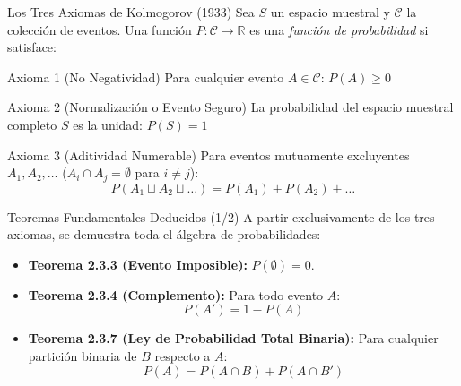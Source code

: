 \begin{frame}{Los Tres Axiomas de Kolmogorov (1933)}
  \small Sea $S$ un espacio muestral y $\mathcal{C}$ la colección de eventos. Una función $P: \mathcal{C} \to \mathbb{R}$ es una \emph{función de probabilidad} si satisface: \pause

  \vspace{0.2em}
  \begin{block}{Axioma 1 (No Negatividad)}
    Para cualquier evento $A \in \mathcal{C}$: $P(A) \geq 0$
  \end{block}

  \vspace{0.1em}
  \pause
  \begin{block}{Axioma 2 (Normalización o Evento Seguro)}
    La probabilidad del espacio muestral completo $S$ es la unidad: $P(S) = 1$
  \end{block}

  \vspace{0.1em}
  \pause
  \begin{block}{Axioma 3 (Aditividad Numerable)}
    Para eventos mutuamente excluyentes $A_1, A_2, \dots$ ($A_i \cap A_j = \emptyset$ para $i \neq j$):
    $$P(A_1 \sqcup A_2 \sqcup \dots) = P(A_1) + P(A_2) + \dots$$
  \end{block}
\end{frame}

\begin{frame}{Teoremas Fundamentales Deducidos (1/2)}
  A partir exclusivamente de los tres axiomas, se demuestra toda el álgebra de probabilidades: \pause

  \vspace{0.4em}
  \begin{itemize}
    \item \textbf{Teorema 2.3.3 (Evento Imposible):} $P(\emptyset) = 0$. \pause
    \vspace{0.3em}
    \item \textbf{Teorema 2.3.4 (Complemento):} Para todo evento $A$:
    $$P(A') = 1 - P(A)$$ \pause
    \vspace{0.3em}
    \item \textbf{Teorema 2.3.7 (Ley de Probabilidad Total Binaria):} Para cualquier partición binaria de $B$ respecto a $A$:
    $$P(A) = P(A \cap B) + P(A \cap B')$$
  \end{itemize}
\end{frame}

